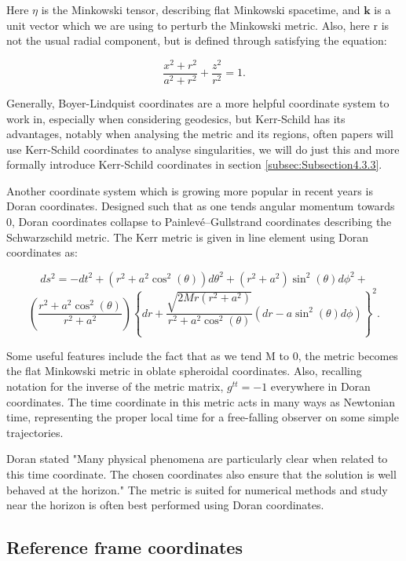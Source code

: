 \documentclass[oneside,openright,frontopenright, singlespacing]{dmathesis}
\begin{document}
	Here $\eta$ is the Minkowski tensor, describing flat Minkowski spacetime, and $\textbf{k}$ is a unit vector which we are using to perturb the Minkowski metric. Also, here r is not the usual radial component, but is defined through satisfying the equation:

	\[\frac{x^2+r^2}{a^2+r^2}+\frac{z^2}{r^2} = 1.\]

	Generally, Boyer-Lindquist coordinates are a more helpful coordinate system to work in, especially when considering geodesics, but Kerr-Schild has its advantages, notably when analysing the metric and its regions, often papers will use Kerr-Schild coordinates to analyse singularities, we will do just this and more formally introduce Kerr-Schild coordinates in section \ref{subsec:Subsection4.3.3}.

\vspace{1em}
	Another coordinate system which is growing more popular in recent years is Doran coordinates\cite{doran2000new}. Designed such that as one tends angular momentum towards 0, Doran coordinates collapse to Painlev\'e–Gullstrand coordinates\cite{painleve1921mecanique} describing the Schwarzschild metric. The Kerr metric is given in line element using Doran coordinates as:

	\[ds^2=-dt^2+(r^2+a^2\cos^2(\theta))d\theta^2+(r^2+a^2)\sin^2(\theta)d\phi^2+\]
	\[\left(\frac{r^2+a^2\cos^2(\theta)}{r^2+a^2}\right)\left\{dr+\frac{\sqrt{2Mr(r^2+a^2)}}{r^2+a^2\cos^2(\theta)}(dr-a\sin^2(\theta)d\phi)\right\}^2.\]

	Some useful features include the fact that as we tend M to 0, the metric becomes the flat Minkowski metric in oblate spheroidal coordinates. Also, recalling notation for the inverse of the metric matrix, $g^{tt}=-1$ everywhere in Doran coordinates. The time coordinate in this metric acts in many ways as Newtonian time, representing the proper local time for a free-falling observer on some simple trajectories. 

\vspace{1em}
	Doran stated "Many physical phenomena are particularly clear when related to this time coordinate. The chosen coordinates also ensure that the solution is well behaved at the horizon."\cite{doran2000new} The metric is suited for numerical methods and study near the horizon is often best performed using Doran coordinates.

\subsection{Reference frame coordinates}\label{subsec:Subsection4.2.1}
\end{document}
